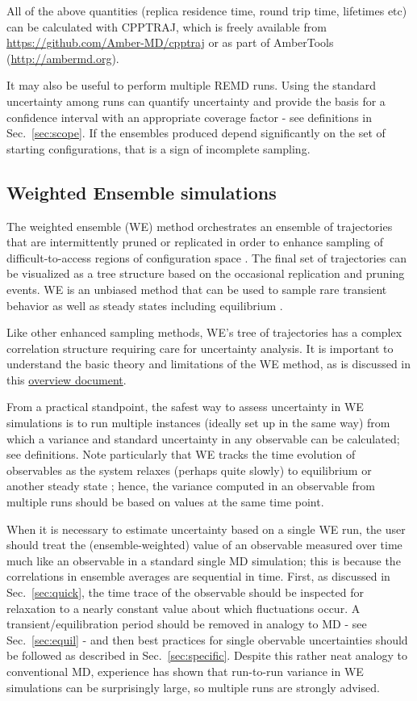 All of the above quantities (replica residence time, round trip time, lifetimes etc) can be calculated with CPPTRAJ,\citep{Roe2013} which is freely available from \url{https://github.com/Amber-MD/cpptraj} or as part of AmberTools (\url{http://ambermd.org}).

It may also be useful to perform multiple REMD runs.  Using the standard uncertainty among runs can quantify uncertainty and provide the basis for a confidence interval with an appropriate coverage factor - see definitions in Sec.\ \ref{sec:scope}.  If the ensembles produced depend significantly on the set of starting configurations, that is a sign of incomplete sampling.

\subsection{Weighted Ensemble simulations}

The weighted ensemble (WE) method orchestrates an ensemble of trajectories that are intermittently pruned or replicated in order to enhance sampling of difficult-to-access regions of configuration space \cite{Huber-1996}.
The final set of trajectories can be visualized as a tree structure based on the occasional replication and pruning events.
WE is an unbiased method that can be used to sample rare transient behavior \cite{Zhang2010a} as well as steady states \cite{Bhatt2010a} including equilibrium \cite{Suarez2014}.

Like other enhanced sampling methods, WE's tree of trajectories has a complex correlation structure requiring care for uncertainty analysis.
It is important to understand the basic theory and limitations of the WE method, as is discussed in this
\href{https://westpa.github.io/westpa/overview.html}{overview document}.

From a practical standpoint, the safest way to assess uncertainty in WE simulations is to run multiple instances (ideally set up in the same way) from which a variance and standard uncertainty in any observable can be calculated; see definitions.
Note particularly that WE tracks the time evolution of observables as the system relaxes (perhaps quite slowly) to equilibrium or another steady state \cite{Zhang2010a}; hence, the variance computed in an observable from multiple runs should be based on values at the same time point.

When it is necessary to estimate uncertainty based on a single WE run, the user should treat the (ensemble-weighted) value of an observable measured over time much like an observable in a standard single MD simulation; this is because the correlations in ensemble averages are sequential in time.
First, as discussed in Sec.\ \ref{sec:quick}, the time trace of the observable should be inspected for relaxation to a nearly constant value about which fluctuations occur.
A transient/equilibration period should be removed in analogy to MD - see Sec.\ \ref{sec:equil} - and then best practices for single obervable uncertainties should be followed as described in Sec.\ \ref{sec:specific}.
Despite this rather neat analogy to conventional MD, experience has shown that run-to-run variance in WE simulations can be surprisingly large, so multiple runs are strongly advised.
